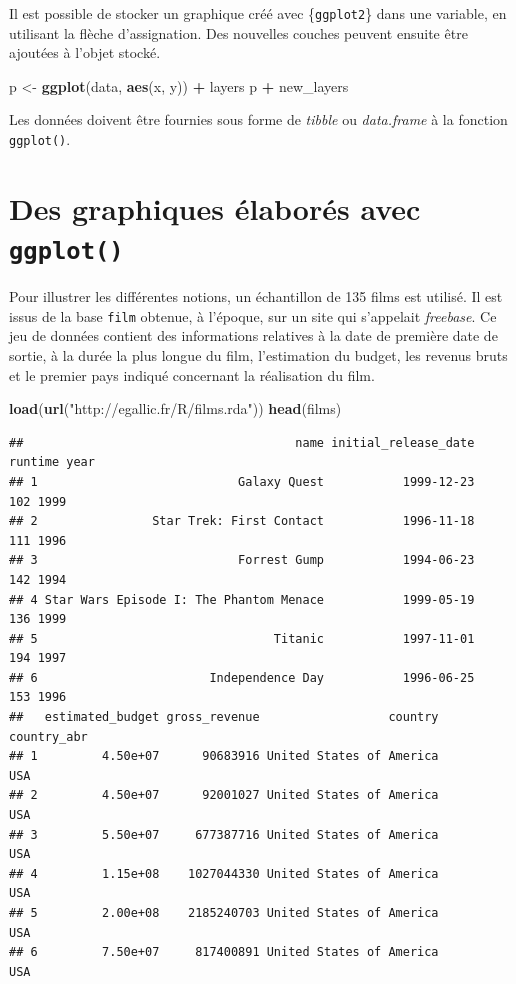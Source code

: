 \documentclass[
  11pt,
]{book}
\newenvironment{Shaded}{\begin{snugshade}}{\end{snugshade}}
\newcommand{\KeywordTok}[1]{\textcolor[rgb]{0.13,0.29,0.53}{\textbf{#1}}}
\newcommand{\NormalTok}[1]{#1}
\newcommand{\OperatorTok}[1]{\textcolor[rgb]{0.81,0.36,0.00}{\textbf{#1}}}
\newcommand{\StringTok}[1]{\textcolor[rgb]{0.31,0.60,0.02}{#1}}
\numberwithin{equation}{section}
\numberwithin{countremarque}{section}
\begin{document}
Il est possible de stocker un graphique créé avec \{\texttt{ggplot2}\} dans une variable, en utilisant la flèche d'assignation. Des nouvelles couches peuvent ensuite être ajoutées à l'objet stocké.

\begin{Shaded}
\begin{Highlighting}[]
\NormalTok{p \textless{}{-}}\StringTok{ }\KeywordTok{ggplot}\NormalTok{(data, }\KeywordTok{aes}\NormalTok{(x, y)) }\OperatorTok{+}\StringTok{ }\NormalTok{layers}
\NormalTok{p }\OperatorTok{+}\StringTok{ }\NormalTok{new\_layers}
\end{Highlighting}
\end{Shaded}

Les données doivent être fournies sous forme de \emph{tibble} ou \emph{data.frame} à la fonction \texttt{ggplot()}.

\hypertarget{graphiques_ggplot}{%
\section{\texorpdfstring{Des graphiques élaborés avec \texttt{ggplot()}}{Des graphiques élaborés avec ggplot()}}\label{graphiques_ggplot}}

Pour illustrer les différentes notions, un échantillon de 135 films est utilisé. Il est issus de la base \texttt{film} obtenue, à l'époque, sur un site qui s'appelait \emph{freebase}. Ce jeu de données contient des informations relatives à la date de première date de sortie, à la durée la plus longue du film, l'estimation du budget, les revenus bruts et le premier pays indiqué concernant la réalisation du film.

\begin{Shaded}
\begin{Highlighting}[]
\KeywordTok{load}\NormalTok{(}\KeywordTok{url}\NormalTok{(}\StringTok{"http://egallic.fr/R/films.rda"}\NormalTok{))}
\KeywordTok{head}\NormalTok{(films)}
\end{Highlighting}
\end{Shaded}

\begin{lstlisting}
##                                      name initial_release_date runtime year
## 1                            Galaxy Quest           1999-12-23     102 1999
## 2                Star Trek: First Contact           1996-11-18     111 1996
## 3                            Forrest Gump           1994-06-23     142 1994
## 4 Star Wars Episode I: The Phantom Menace           1999-05-19     136 1999
## 5                                 Titanic           1997-11-01     194 1997
## 6                        Independence Day           1996-06-25     153 1996
##   estimated_budget gross_revenue                  country country_abr
## 1         4.50e+07      90683916 United States of America         USA
## 2         4.50e+07      92001027 United States of America         USA
## 3         5.50e+07     677387716 United States of America         USA
## 4         1.15e+08    1027044330 United States of America         USA
## 5         2.00e+08    2185240703 United States of America         USA
## 6         7.50e+07     817400891 United States of America         USA
\end{lstlisting}
\end{document}
